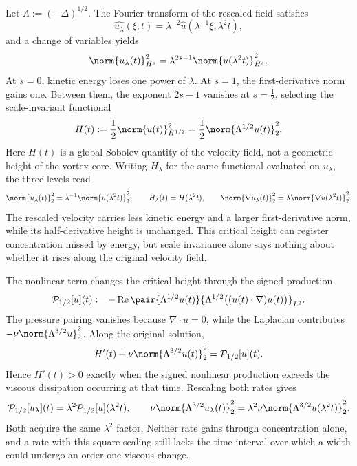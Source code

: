 Let \(\Lambda:=(-\Delta)^{1/2}\). The Fourier transform of the rescaled field satisfies
\[
  \widehat{u_\lambda}(\xi,t)
  =
  \lambda^{-2}\widehat u(\lambda^{-1}\xi,\lambda^2t),
\]
and a change of variables yields
\[
  \norm{u_\lambda(t)}_{\dot H^s}^2
  =
  \lambda^{2s-1}
  \norm{u(\lambda^2t)}_{\dot H^s}^2.
\]
At \(s=0\), kinetic energy loses one power of \(\lambda\). At \(s=1\), the first-derivative norm gains one. Between them, the exponent \(2s-1\) vanishes at \(s=\tfrac12\), selecting the scale-invariant functional
\[
  H(t)
  :=
  \frac12\norm{u(t)}_{\dot H^{1/2}}^2
  =
  \frac12\norm{\Lambda^{1/2}u(t)}_2^2.
\]
Here \(H(t)\) is a global Sobolev quantity of the velocity field, not a geometric height of the vortex core. Writing \(H_\lambda\) for the same functional evaluated on \(u_\lambda\), the three levels read
\[
  \norm{u_\lambda(t)}_2^2
  =
  \lambda^{-1}\norm{u(\lambda^2t)}_2^2,
  \qquad
  H_\lambda(t)=H(\lambda^2t),
  \qquad
  \norm{\nabla u_\lambda(t)}_2^2
  =
  \lambda\norm{\nabla u(\lambda^2t)}_2^2.
\]
The rescaled velocity carries less kinetic energy and a larger first-derivative norm, while its half-derivative height is unchanged. This critical height can register concentration missed by energy, but scale invariance alone says nothing about whether it rises along the original velocity field.


The nonlinear term changes the critical height through the signed production
\[
  \mathcal P_{1/2}[u](t)
  :=
  -\operatorname{Re}
  \pair
    {\Lambda^{1/2}u(t)}
    {\Lambda^{1/2}\bigl((u(t)\cdot\nabla)u(t)\bigr)}_{L^2}.
\]
The pressure pairing vanishes because \(\nabla\cdot u=0\), while the Laplacian contributes \(-\nu\norm{\Lambda^{3/2}u}_2^2\). Along the original solution,
\[
  H'(t)
  +
  \nu\norm{\Lambda^{3/2}u(t)}_2^2
  =
  \mathcal P_{1/2}[u](t).
\]
Hence \(H'(t)>0\) exactly when the signed nonlinear production exceeds the viscous dissipation occurring at that time. Rescaling both rates gives
\[
  \mathcal P_{1/2}[u_\lambda](t)
  =
  \lambda^2\mathcal P_{1/2}[u](\lambda^2t),
  \qquad
  \nu\norm{\Lambda^{3/2}u_\lambda(t)}_2^2
  =
  \lambda^2\nu\norm{\Lambda^{3/2}u(\lambda^2t)}_2^2.
\]
Both acquire the same \(\lambda^2\) factor. Neither rate gains through concentration alone, and a rate with this square scaling still lacks the time interval over which a width could undergo an order-one viscous change.


